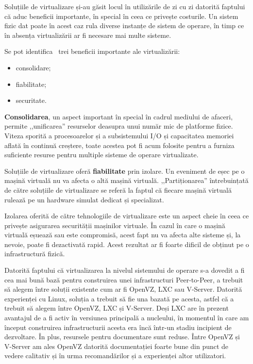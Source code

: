 Soluțiile de virtualizare și-au găsit locul în utilizările de zi cu zi
datorită faptului că aduc beneficii importante, în special în ceea ce
privește costurile. Un sistem fizic dat poate în acest caz rula diverse
instanțe de sistem de operare, în timp ce în absența virtualizării ar fi
necesare mai multe sisteme.

Se pot identifica~\cite{best-damn-virt} trei beneficii importante ale
virtualizării:

\begin{itemize}
  \item consolidare;
  \item fiabilitate;
  \item securitate.
\end{itemize}

\textbf{Consolidarea}, un aspect important în special în cadrul mediului
de afaceri, permite ,,unificarea'' resurselor deasupra unui număr mic
de platforme fizice. Viteza sporită a procesoarelor și a subsistemului I/O
și capacitatea memoriei aflată în continuă creștere, toate acestea pot
fi acum folosite pentru a furniza suficiente resurse pentru multiple
sisteme de operare virtualizate.

Soluțiile de virtualizare oferă \textbf{fiabilitate} prin izolare. Un
eveniment de eșec pe o mașină virtuală nu va afecta o altă mașină virtuală.
,,Partiționarea'' întrebuințată de către soluțiile de virtualizare se
referă la faptul că fiecare mașină virtuală rulează pe un hardware simulat
dedicat și specializat.

Izolarea oferită de către tehnologiile de virtualizare este un aspect cheie
în ceea ce privește asigurarea securității mașinilor virtuale. În cazul
în care o mașină virtuală eșuează sau este compromisă, acest fapt nu va
afecta alte sisteme și, la nevoie, poate fi dezactivată rapid. Acest
rezultat ar fi foarte dificil de obținut pe o infrastructură fizică.

Datorită faptului că virtualizarea la nivelul sistemului de operare s-a
dovedit a fi cea mai bună bază pentru construirea unei infrastructuri
Peer-to-Peer, a trebuit să alegem între soluții existente cum ar fi
OpenVZ, LXC sau V-Server. Datorită experienței cu Linux, soluția a trebuit
să fie una bazată pe acesta, astfel că a trebuit să alegem între OpenVZ,
LXC și V-Server. Deși LXC are în prezent avantajul de a fi activ în versiunea
principală a nucleului, în momentul în care am început construirea
infrastructurii acesta era încă într-un stadiu incipient de dezvoltare.
În plus, resursele pentru documentare sunt reduse. Între OpenVZ și V-Server
am ales OpenVZ datorită documentației foarte bune din punct de vedere
calitativ și în urma recomandărilor și a experienței altor utilizatori.

